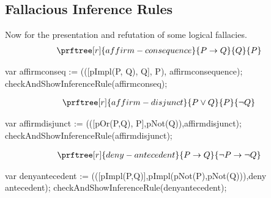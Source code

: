 \documentclass[letterpaper,10pt,english]{sphinxmanual}
\begin{document}
\subsection{Fallacious Inference Rules}
\label{\detokenize{13-consequence:fallacious-inference-rules}}
Now for the presentation and refutation of some logical fallacies.
\begin{equation*}
\begin{split}\prftree[r]{affirm-consequence}{P \rightarrow Q}{Q}{P}\end{split}
\end{equation*}
\begin{sphinxVerbatim}[commandchars=\\\{\}]
var affirm\PYGZus{}conseq  := (([pImpl(P, Q), Q], P), \PYGZdq{}affirm\PYGZus{}consequence\PYGZdq{});
checkAndShowInferenceRule(affirm\PYGZus{}conseq);
\end{sphinxVerbatim}
\begin{equation*}
\begin{split}\prftree[r]{affirm-disjunct}{P \lor Q}{P}{\neg Q}\end{split}
\end{equation*}
\begin{sphinxVerbatim}[commandchars=\\\{\}]
var affirm\PYGZus{}disjunct := (([pOr(P,Q), P],pNot(Q)),\PYGZdq{}affirm\PYGZus{}disjunct\PYGZdq{});
checkAndShowInferenceRule(affirm\PYGZus{}disjunct);
\end{sphinxVerbatim}
\begin{equation*}
\begin{split}\prftree[r]{deny-antecedent}{P \rightarrow Q}{{\neg P} \rightarrow {\neg Q}}\end{split}
\end{equation*}
\begin{sphinxVerbatim}[commandchars=\\\{\}]
var deny\PYGZus{}antecedent := (([pImpl(P,Q)],pImpl(pNot(P),pNot(Q))),\PYGZdq{}deny antecedent\PYGZdq{});
checkAndShowInferenceRule(deny\PYGZus{}antecedent);
\end{sphinxVerbatim}
\end{document}
